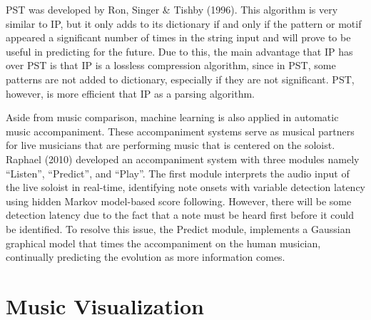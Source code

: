 PST was developed by Ron, Singer \& Tishby (1996). This algorithm is very similar to IP, but it only adds to its dictionary if and only if the pattern or motif appeared a significant number of times in the string input and will prove to be useful in predicting for the future. Due to this, the main advantage that IP has over PST is that IP is a lossless compression algorithm, since in PST, some patterns are not added to dictionary, especially if they are not significant. PST, however, is more efficient that IP as a parsing algorithm.

	Aside from music comparison, machine learning is also applied in automatic music accompaniment. These accompaniment systems serve as musical partners for live musicians that are performing music that is centered on the soloist. Raphael (2010) developed an accompaniment system with three modules namely “Listen”, “Predict”, and “Play”. The first module interprets the audio input of the live soloist in real-time, identifying note onsets with variable detection latency using hidden Markov model-based score following. However, there will be some detection latency due to the fact that a note must be heard first before it could be identified. To resolve this issue, the Predict module, implements a Gaussian graphical model  that times the accompaniment  on the human musician, continually predicting the evolution as more information comes. 


\section{Music Visualization}

